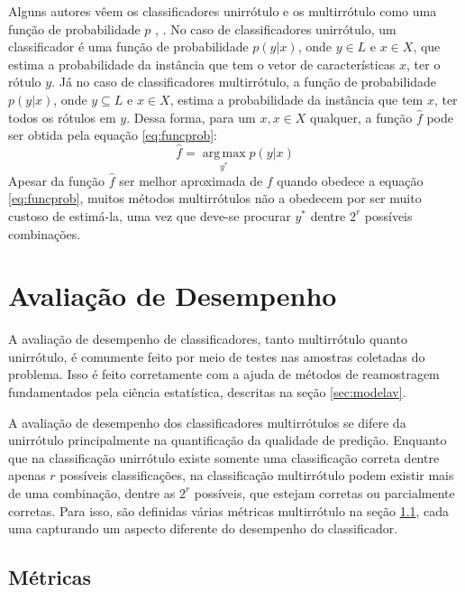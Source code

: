 Alguns autores vêem os classificadores unirrótulo e os multirrótulo como uma função de probabilidade $p$ \cite{mcc2012}, \cite{pcc2010}.
No caso de classificadores unirrótulo, um classificador é uma função de probabilidade $p(y|x)$,
onde $y \in L$ e $x \in X$,
que estima a probabilidade da instância que tem o vetor de características $x$, ter o rótulo $y$.
Já no caso de classificadores multirrótulo, a função de probabilidade $p(y|x)$, onde $y \subseteq L$ e $x \in X$,
estima a probabilidade da instância que tem $x$, ter todos os rótulos em $y$.
Dessa forma, para um $x,x\in X$ qualquer, a função $\hat{f}$
pode ser obtida pela equação \ref{eq:funcprob}:
\begin{equation} \label{eq:funcprob}
 \hat{f}=\operatorname*{arg\,max}_{y^*} p(y|x)
\end{equation}
Apesar da função $\hat{f}$ ser melhor aproximada de $f$ quando obedece a equação \ref{eq:funcprob}, 
muitos métodos multirrótulos não a obedecem por ser muito custoso de estimá-la, uma vez que deve-se
procurar $y^*$ dentre $2^r$ possíveis combinações.



\section{Avaliação de Desempenho}
A avaliação de desempenho de classificadores, tanto multirrótulo quanto unirrótulo, é comumente feito
por meio de testes nas amostras coletadas do problema.
Isso é feito corretamente com a ajuda de métodos de reamostragem fundamentados pela ciência estatística,
descritas na seção \ref{sec:modelav}.

A avaliação de desempenho dos classificadores multirrótulos se difere da unirrótulo principalmente na
quantificação da qualidade de predição. Enquanto que na classificação unirrótulo existe somente uma classificação
correta dentre apenas $r$ possíveis classificações, na classificação multirrótulo podem existir mais de uma combinação, 
dentre as $2^r$ possíveis, que estejam corretas ou parcialmente corretas.
Para isso, são definidas várias métricas multirrótulo na seção \ref{sec:metrics},
cada uma capturando um aspecto diferente do desempenho do classificador. 



\subsection{Métricas}
\label{sec:metrics}

